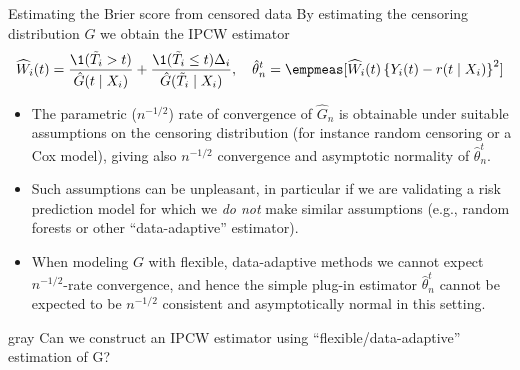 \documentclass[smaller]{beamer}\usepackage{listings}
\begin{document}
\begin{frame}[label={sec:org3b1f0e6}]{Estimating the Brier score from censored data}
\small
By estimating the censoring distribution \(G\) we obtain the IPCW estimator
\begin{equation*}
  \widehat{W}_i(t)=\frac{\1({\tilde{T}_i >t})}{\hat{G}(t \mid X_i)} + \frac{\1({\tilde{T}_i\leq
      t})\Delta_i}{\hat{G}(\tilde{T}_i\mid X_i)},
  \quad \hat{\theta}_n^t = \empmeas[\widehat{W}_i(t)
  \left\{
    Y_i(t) - r(t \mid X_i)
  \right\}^2]
\end{equation*}

\vfill \pause
\begin{itemize}
\item The parametric (\(n^{-1/2}\)) rate of convergence of \(\hat G_n\) is obtainable under suitable
assumptions on the censoring distribution (for instance random censoring or a Cox model),
giving also \(n^{-1/2}\) convergence and asymptotic normality of \(\hat\theta^t_n\). \pause
\item Such assumptions can be unpleasant, in particular if we are validating a risk prediction model
for which we \emph{do not} make similar assumptions (e.g., random forests or other ``data-adaptive''
estimator). \pause
\item When modeling \(G\) with flexible, data-adaptive methods we cannot expect \(n^{-1/2}\)-rate
convergence, and hence the simple plug-in estimator \(\hat\theta^t_n\) cannot be expected to be
\(n^{-1/2}\) consistent and asymptotically normal in this setting. \pause
	 \vfill
\end{itemize}

\begin{beamercolorbox}[rounded=true]{gray}
\normalsize \centering Can we construct an IPCW estimator using ``flexible/data-adaptive''
estimation of G?
\end{beamercolorbox}
\end{frame}
\end{document}
